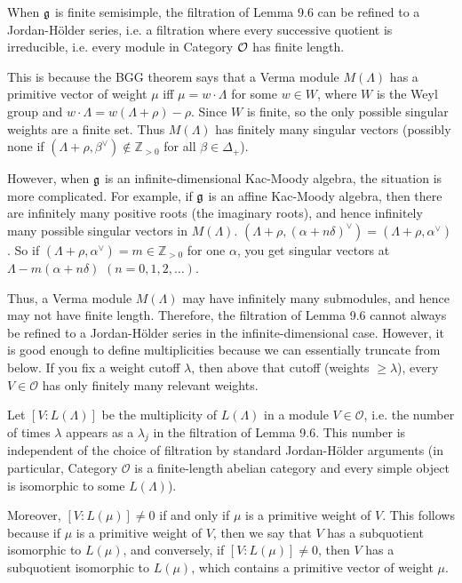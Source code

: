 \documentclass[12pt]{article}
\begin{document}
\begin{remark}
    When $\mathfrak{g}$ is finite semisimple, the filtration of Lemma 9.6 can be refined to a Jordan-Hölder series, i.e. a filtration where every successive quotient is irreducible, i.e. every module in Category ${\mathcal{O}}$ has finite length.

    This is because the BGG theorem says that a Verma module $M(\Lambda)$ has a primitive vector of weight $\mu$ iff $\mu=w\!\cdot\!\Lambda$ for some $w\in W$, where $W$ is the Weyl group and $w\!\cdot\!\Lambda=w(\Lambda+\rho)-\rho$. Since $W$ is finite, so the only possible singular weights are a finite set. Thus $M(\Lambda)$ has finitely many singular vectors (possibly none if $(\Lambda+\rho,\beta^\vee)\notin\mathbb Z_{>0}$ for all $\beta\in\Delta_+$).


    However, when $\mathfrak{g}$ is an infinite-dimensional Kac-Moody algebra, the situation is more complicated. For example, if $\mathfrak{g}$ is an affine Kac-Moody algebra, then there are infinitely many positive roots (the imaginary roots), and hence infinitely many possible singular vectors in $M(\Lambda)$.
    $(\Lambda+\rho,(\alpha+n\delta)^\vee)=(\Lambda+\rho,\alpha^\vee)$. So if $(\Lambda+\rho,\alpha^\vee)=m\in\mathbb{Z}_{>0}$ for one $\alpha$, you get singular vectors at $\Lambda-m(\alpha+n\delta)$ $(n=0,1,2,\dots)$.


    Thus, a Verma module $M(\Lambda)$ may have infinitely many submodules, and hence may not have finite length. Therefore, the filtration of Lemma 9.6 cannot always be refined to a Jordan-Hölder series in the infinite-dimensional case. However, it is good enough to define multiplicities because we can essentially truncate from below. If you fix a weight cutoff $\lambda$, then above that cutoff (weights $\geq \lambda$), every $V\in\mathcal O$ has only finitely many relevant weights.
\end{remark}

Let $[V:L(\Lambda)]$ be the multiplicity of $L(\Lambda)$ in a module $V \in \mathcal{O}$, i.e. the number of times $\lambda$ appears as a $\lambda_j$ in the filtration of Lemma 9.6. This number is independent of the choice of filtration by standard Jordan-Hölder arguments (in particular, Category $\mathcal{O}$ is a finite-length abelian category and every simple object is isomorphic to some $L(\Lambda)$).

Moreover, $[V:L(\mu)] \neq 0$ if and only if $\mu$ is a primitive weight of $V$. This follows because if $\mu$ is a primitive weight of $V$, then we say that $V$ has a subquotient isomorphic to $L(\mu)$, and conversely, if $[V:L(\mu)] \neq 0$, then $V$ has a subquotient isomorphic to $L(\mu)$, which contains a primitive vector of weight $\mu$.
\end{document}
